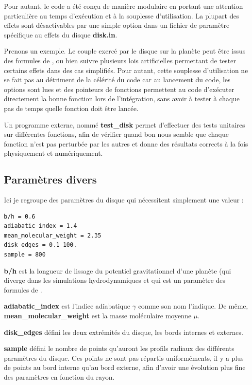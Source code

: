 Pour autant, le code a été conçu de manière modulaire en portant une attention particulière au temps d'exécution et à la souplesse d'utilisation. La plupart des effets sont désactivables par une simple option dans un fichier de paramètre spécifique au effets du disque \textbf{disk.in}. 

Prenons un exemple. Le couple exercé par le disque sur la planète peut être issus des formules de \cite{paardekooper2011torque}, ou bien suivre plusieurs lois artificielles permettant de tester certains effets dans des cas simplifiés. Pour autant, cette souplesse d'utilisation ne se fait pas au détriment de la célérité du code car au lancement du code, les options sont lues et des pointeurs de fonctions permettent au code d'exécuter directement la bonne fonction lors de l'intégration, sans avoir à tester à chaque pas de temps quelle fonction doit être lancée. 

\bigskip

Un programme externe, nommé \textbf{test\_disk} permet d'effectuer des tests unitaires sur différentes fonctions, afin de vérifier quand bon nous semble que chaque fonction n'est pas perturbée par les autres et donne des résultats corrects à la fois physiquement et numériquement.

\subsection{Paramètres divers}
Ici je regroupe des paramètres du disque qui nécessitent simplement une valeur : 
\begin{verbatim}
b/h = 0.6
adiabatic_index = 1.4
mean_molecular_weight = 2.35
disk_edges = 0.1 100.
sample = 800
\end{verbatim}

\textbf{b/h} est la longueur de lissage du potentiel gravitationnel d'une planète (qui diverge dans les simulations hydrodynamiques et qui est un paramètre des formules de \cite{paardekooper2011torque}.

\textbf{adiabatic\_index} est l'indice adiabatique $\gamma$ comme son nom l'indique. De même, \textbf{mean\_molecular\_weight} est la masse moléculaire moyenne $\mu$.

\textbf{disk\_edges} défini les deux extrémités du disque, les bords internes et externes.

\textbf{sample} défini le nombre de points qu'auront les profils radiaux des différents paramètres du disque. Ces points ne sont pas répartis uniforméments, il y a plus de points au bord interne qu'au bord externe, afin d'avoir une évolution plus fine des paramètres en fonction du rayon.

